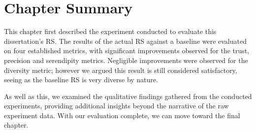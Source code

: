 \section{Chapter Summary}

This chapter first described the experiment conducted to evaluate this dissertation's RS.
The results of the actual RS against a baseline were evaluated on four established metrics,
with significant improvements observed for the trust, precision and serendipity metrics.
Negligible improvements were observed for the diversity metric; however we argued this result 
is still considered satisfactory, seeing as the baseline RS is very diverse by nature.

As well as this, we examined the qualitative findings gathered from the conducted experiments,
providing additional insights beyond the narrative of the raw experiment data.
With our evaluation complete, we can move toward the final chapter.
